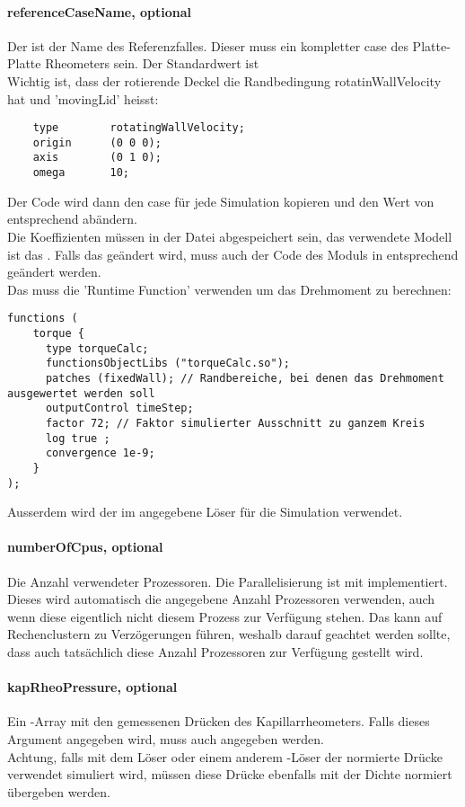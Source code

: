 \paragraph{referenceCaseName, optional}
Der  ist der Name des Referenzfalles. Dieser muss ein kompletter \openfoam{} case des Platte-Platte Rheometers sein. Der Standardwert ist \\
Wichtig ist, dass der rotierende Deckel die Randbedingung rotatinWallVelocity hat und 'movingLid' heisst:
\begin{lstlisting}
    type        rotatingWallVelocity;
    origin      (0 0 0);
    axis        (0 1 0);
    omega       10;
\end{lstlisting}
Der Code wird dann den case für jede Simulation kopieren und den Wert von  entsprechend abändern.\\
Die Koeffizienten müssen in der Datei  abgespeichert sein, das verwendete Modell ist das . Falls das geändert wird, muss auch der Code des Moduls in  entsprechend geändert werden.\\
Das  muss die 'Runtime Function'  verwenden um das Drehmoment zu berechnen:
\begin{lstlisting}
functions (
    torque {
      type torqueCalc;
      functionsObjectLibs ("torqueCalc.so");
      patches (fixedWall); // Randbereiche, bei denen das Drehmoment ausgewertet werden soll
      outputControl timeStep;
      factor 72; // Faktor simulierter Ausschnitt zu ganzem Kreis
      log true ;
      convergence 1e-9;
    }
);
\end{lstlisting}
Ausserdem wird der im  angegebene Löser für die Simulation verwendet.
%
\paragraph{numberOfCpus, optional}
Die Anzahl verwendeter Prozessoren. Die Parallelisierung ist mit  implementiert. Dieses wird automatisch die angegebene Anzahl Prozessoren verwenden, auch wenn diese eigentlich nicht diesem Prozess zur Verfügung stehen. Das kann auf Rechenclustern zu Verzögerungen führen, weshalb darauf geachtet werden sollte, dass auch tatsächlich diese Anzahl Prozessoren zur Verfügung gestellt wird.
%
\paragraph{kapRheoPressure, optional}
Ein -Array mit den gemessenen Drücken des Kapillarrheometers. Falls dieses Argument angegeben wird, muss auch  angegeben werden.\\
Achtung, falls mit dem Löser  oder einem anderem \openfoam{}-Löser der normierte Drücke verwendet simuliert wird, müssen diese Drücke ebenfalls mit der Dichte normiert übergeben werden.
%
